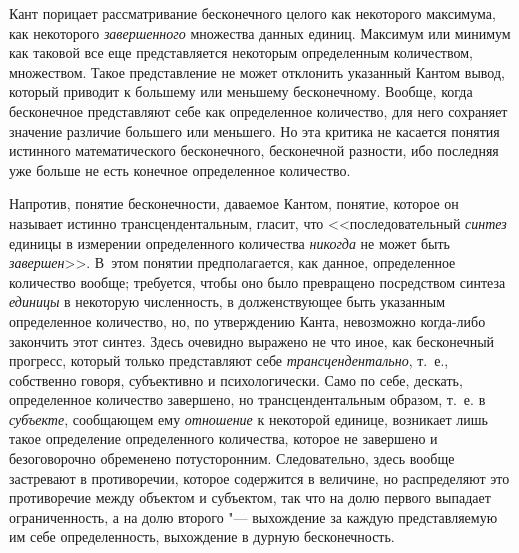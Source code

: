 Кант порицает рассматривание бесконечного целого как некоторого максимума,
как некоторого {\em завершенного} множества данных
единиц. Максимум или минимум как таковой все еще представляется некоторым
определенным количеством, множеством. Такое представление не может
отклонить указанный Кантом вывод, который приводит к большему или меньшему
бесконечному. Вообще, когда бесконечное представляют себе как определенное
количество, для него сохраняет значение различие большего или меньшего. Но
эта критика не касается понятия истинного математического бесконечного,
бесконечной разности, ибо последняя уже больше не есть конечное
определенное количество.

Напротив, понятие бесконечности, даваемое Кантом, понятие, которое он
называет истинно трансцендентальным, гласит, что <<последовательный
{\em синтез} единицы в измерении определенного
количества {\em никогда} не может быть
{\em завершен}>>. В~этом понятии предполагается, как
данное, определенное количество вообще; требуется, чтобы оно было
превращено посредством синтеза {\em единицы} в
некоторую численность, в долженствующее быть указанным определенное
количество, но, по утверждению Канта, невозможно когда-либо закончить этот
синтез. Здесь очевидно выражено не что иное, как бесконечный прогресс,
который только представляют себе
{\em трансцендентально}, т.~е., собственно говоря,
субъективно и психологически. Само по себе, дескать, определенное
количество завершено, но трансцендентальным образом, т.~е. в
{\em субъекте}, сообщающем ему
{\em отношение} к некоторой единице, возникает лишь
такое определение определенного количества, которое не завершено и
безоговорочно обременено потусторонним. Следовательно, здесь вообще
застревают в противоречии, которое содержится в величине, но распределяют
это противоречие между объектом и субъектом, так что на долю первого
выпадает ограниченность, а на долю второго "--- выхождение за каждую
представляемую им себе определенность, выхождение в дурную бесконечность.

